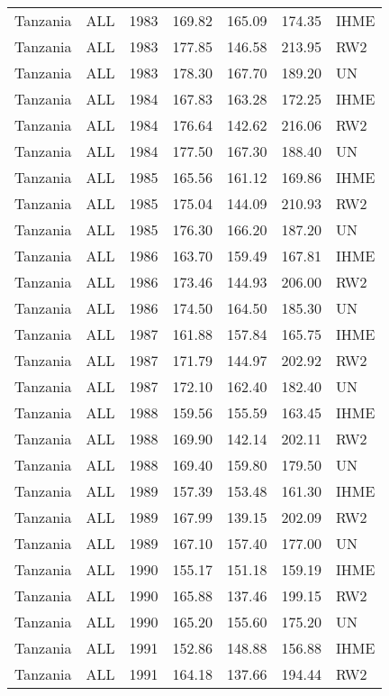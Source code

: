 \begin{longtable}{lllrrrl}
  Tanzania & ALL & 1983 & 169.82 & 165.09 & 174.35 & IHME \\ 
  Tanzania & ALL & 1983 & 177.85 & 146.58 & 213.95 & RW2 \\ 
  Tanzania & ALL & 1983 & 178.30 & 167.70 & 189.20 & UN \\ 
  Tanzania & ALL & 1984 & 167.83 & 163.28 & 172.25 & IHME \\ 
  Tanzania & ALL & 1984 & 176.64 & 142.62 & 216.06 & RW2 \\ 
  Tanzania & ALL & 1984 & 177.50 & 167.30 & 188.40 & UN \\ 
  Tanzania & ALL & 1985 & 165.56 & 161.12 & 169.86 & IHME \\ 
  Tanzania & ALL & 1985 & 175.04 & 144.09 & 210.93 & RW2 \\ 
  Tanzania & ALL & 1985 & 176.30 & 166.20 & 187.20 & UN \\ 
  Tanzania & ALL & 1986 & 163.70 & 159.49 & 167.81 & IHME \\ 
  Tanzania & ALL & 1986 & 173.46 & 144.93 & 206.00 & RW2 \\ 
  Tanzania & ALL & 1986 & 174.50 & 164.50 & 185.30 & UN \\ 
  Tanzania & ALL & 1987 & 161.88 & 157.84 & 165.75 & IHME \\ 
  Tanzania & ALL & 1987 & 171.79 & 144.97 & 202.92 & RW2 \\ 
  Tanzania & ALL & 1987 & 172.10 & 162.40 & 182.40 & UN \\ 
  Tanzania & ALL & 1988 & 159.56 & 155.59 & 163.45 & IHME \\ 
  Tanzania & ALL & 1988 & 169.90 & 142.14 & 202.11 & RW2 \\ 
  Tanzania & ALL & 1988 & 169.40 & 159.80 & 179.50 & UN \\ 
  Tanzania & ALL & 1989 & 157.39 & 153.48 & 161.30 & IHME \\ 
  Tanzania & ALL & 1989 & 167.99 & 139.15 & 202.09 & RW2 \\ 
  Tanzania & ALL & 1989 & 167.10 & 157.40 & 177.00 & UN \\ 
  Tanzania & ALL & 1990 & 155.17 & 151.18 & 159.19 & IHME \\ 
  Tanzania & ALL & 1990 & 165.88 & 137.46 & 199.15 & RW2 \\ 
  Tanzania & ALL & 1990 & 165.20 & 155.60 & 175.20 & UN \\ 
  Tanzania & ALL & 1991 & 152.86 & 148.88 & 156.88 & IHME \\ 
  Tanzania & ALL & 1991 & 164.18 & 137.66 & 194.44 & RW2 \\ 

\end{longtable}
